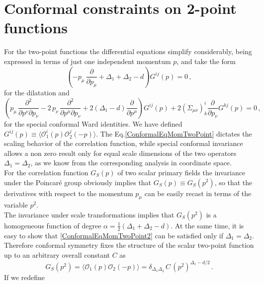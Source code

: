 \documentclass[a4paper,11pt,openright,twoside]{book}
\numberwithin{equation}{section}
\begin{document}
\section{Conformal constraints on 2-point functions\label{TwoPointSection}}
For the two-point functions the differential equations simplify considerably, being expressed in terms 
of just one independent momentum $p$, and take the form
%
\begin{equation}
	\label{ConformalEqMomTwoPoint}
	\left( - p_{\mu} \, \frac{\partial}{\partial p_{\mu}}  + \Delta_1 + \Delta_2 - d \right) G^{ij}(p) = 0 \,, 
\end{equation}
for the dilatation and 
\begin{equation}
	\left(  p_{\mu} \, \frac{\partial^2}{\partial p^{\nu} \partial p_{\nu}}  - 2 \, p_{\nu} \, \frac{\partial^2}{ \partial p^{\mu} 
		\partial p_{\nu} }    + 2 (\Delta_1 - d) \frac{\partial}{\partial p^{\mu}}\right) G^{ij}(p)  + 2 (\Sigma_{\mu\nu})^{i}_{k} \frac{\partial}{\partial 
		p_{\nu}}  G^{kj}(p)   = 0 \,,\label{ConformalEqMomTwoPoint2}
\end{equation}
for the special conformal Ward identities. We have defined $G^{ij}(p) \equiv \langle \mathcal O_1^i(p) \mathcal O_2^j(-p) \rangle$. The Eq.\eqref{ConformalEqMomTwoPoint} dictates the scaling behavior of the correlation function, while special conformal 
invariance allows a non zero result only for equal scale dimensions of the two operators $\Delta_1 = \Delta_2$, as we know from the 
corresponding analysis in coordinate space. \\
%
For the correlation function $G_S(p)$ of two scalar primary fields the invariance under the Poincar\'{e} group obviously 
implies that $G_S(p) \equiv G_S(p^2)$, so that the derivatives with respect to the momentum $p_\mu$ can be easily recast in terms of 
the variable $p^2$. \\
The invariance under scale transformations implies that $G_S(p^2)$ is a homogeneous function of degree 
$\alpha = \frac{1}{2}(\Delta_1 + \Delta_2 - d)$. 
At the same time, it is easy to show that \eqref{ConformalEqMomTwoPoint2} can be satisfied only if $\Delta_1 = \Delta_2$. 
Therefore conformal symmetry fixes the structure of the scalar two-point function up to an arbitrary overall constant $C$ as
%
\begin{equation}
	\label{TwoPointScalar}
	G_S(p^2) = \langle \mathcal O_1(p) \mathcal O_2(-p) \rangle = \delta_{\Delta_1 \Delta_2}  \, C\, (p^2)^{\Delta_1 - d/2} \, .
\end{equation}
%
If we redefine
\end{document}
